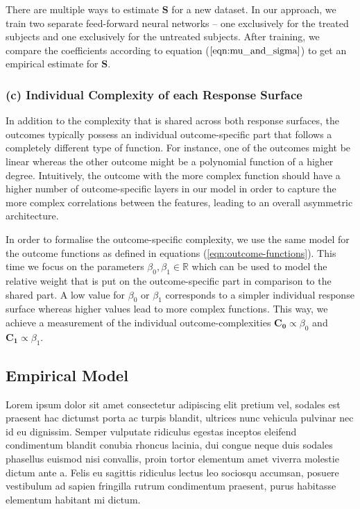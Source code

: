 There are multiple ways to estimate $\mathbf{S}$ for a new dataset. In our approach, we train two separate feed-forward neural networks -- one exclusively for the treated subjects and one exclusively for the untreated subjects. After training, we compare the coefficients according to equation ($\ref{eqn:mu_and_sigma}$) to get an empirical estimate for $\mathbf{S}$. 

\subsubsection{(c) Individual Complexity of each Response Surface}
In addition to the complexity that is shared across both response surfaces, the outcomes typically possess an individual outcome-specific part that follows a completely different type of function. For instance, one of the outcomes might be linear whereas the other outcome might be a polynomial function of a higher degree. 
Intuitively, the outcome with the more complex function should have a higher number of outcome-specific layers in our model in order to capture the more complex correlations between the features, leading to an overall asymmetric architecture. 

In order to formalise the outcome-specific complexity, we use the same model for the outcome functions as defined in equations (\ref{eqn:outcome-functions}). This time we focus on the parameters $\beta_0, \beta_1 \in \mathbb{R}$ which can be used to model the relative weight that is put on the outcome-specific part in comparison to the shared part. A low value for $\beta_0$ or $\beta_1$ corresponds to a simpler individual response surface whereas higher values lead to more complex functions.  This way, we achieve a measurement of the individual outcome-complexities $\mathbf{C_0} \propto \beta_0$ and $\mathbf{C_1} \propto \beta_1$.

\subsection{Empirical Model} \label{sec:empirical-model}
Lorem ipsum dolor sit amet consectetur adipiscing elit pretium vel, sodales est praesent hac dictumst porta ac turpis blandit, ultrices nunc vehicula pulvinar nec id eu dignissim. Semper vulputate ridiculus egestas inceptos eleifend condimentum blandit conubia rhoncus lacinia, dui congue neque duis sodales phasellus euismod nisi convallis, proin tortor elementum amet viverra molestie dictum ante a. Felis eu sagittis ridiculus lectus leo sociosqu accumsan, posuere vestibulum ad sapien fringilla rutrum condimentum praesent, purus habitasse elementum habitant mi dictum.

